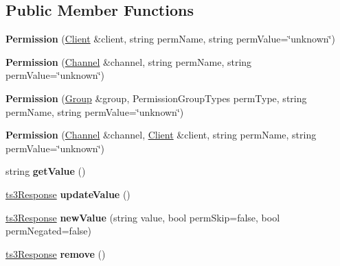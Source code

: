 \subsection*{Public Member Functions}
\begin{DoxyCompactItemize}
\item 
{\bfseries Permission} (\hyperlink{class_ts3_api_1_1_client}{Client} \&client, string perm\+Name, string perm\+Value=\char`\"{}unknown\char`\"{})\hypertarget{class_ts3_api_1_1_permission_a23776714b17d9ee0f797d753d2f2fd7c}{}\label{class_ts3_api_1_1_permission_a23776714b17d9ee0f797d753d2f2fd7c}

\item 
{\bfseries Permission} (\hyperlink{class_ts3_api_1_1_channel}{Channel} \&channel, string perm\+Name, string perm\+Value=\char`\"{}unknown\char`\"{})\hypertarget{class_ts3_api_1_1_permission_a5d5631490a405de685e2808b07804634}{}\label{class_ts3_api_1_1_permission_a5d5631490a405de685e2808b07804634}

\item 
{\bfseries Permission} (\hyperlink{class_ts3_api_1_1_group}{Group} \&group, Permission\+Group\+Types perm\+Type, string perm\+Name, string perm\+Value=\char`\"{}unknown\char`\"{})\hypertarget{class_ts3_api_1_1_permission_aca1a5d43dbaed5958de510891b3c222d}{}\label{class_ts3_api_1_1_permission_aca1a5d43dbaed5958de510891b3c222d}

\item 
{\bfseries Permission} (\hyperlink{class_ts3_api_1_1_channel}{Channel} \&channel, \hyperlink{class_ts3_api_1_1_client}{Client} \&client, string perm\+Name, string perm\+Value=\char`\"{}unknown\char`\"{})\hypertarget{class_ts3_api_1_1_permission_a1ef81bfe7b4b293129150c76a675efe6}{}\label{class_ts3_api_1_1_permission_a1ef81bfe7b4b293129150c76a675efe6}

\item 
string {\bfseries get\+Value} ()\hypertarget{class_ts3_api_1_1_permission_a10dfa432a057a22ef4f2564f4246fcad}{}\label{class_ts3_api_1_1_permission_a10dfa432a057a22ef4f2564f4246fcad}

\item 
\hyperlink{struct_ts3_api_1_1ts3_response}{ts3\+Response} {\bfseries update\+Value} ()\hypertarget{class_ts3_api_1_1_permission_a7c3bc67c4c4e8dfe5426b7ff3f7df91a}{}\label{class_ts3_api_1_1_permission_a7c3bc67c4c4e8dfe5426b7ff3f7df91a}

\item 
\hyperlink{struct_ts3_api_1_1ts3_response}{ts3\+Response} {\bfseries new\+Value} (string value, bool perm\+Skip=false, bool perm\+Negated=false)\hypertarget{class_ts3_api_1_1_permission_a8ad645707969516438deb0db0132024e}{}\label{class_ts3_api_1_1_permission_a8ad645707969516438deb0db0132024e}

\item 
\hyperlink{struct_ts3_api_1_1ts3_response}{ts3\+Response} {\bfseries remove} ()\hypertarget{class_ts3_api_1_1_permission_a0afab6f74c467118a231955909012fc2}{}\label{class_ts3_api_1_1_permission_a0afab6f74c467118a231955909012fc2}

\end{DoxyCompactItemize}
